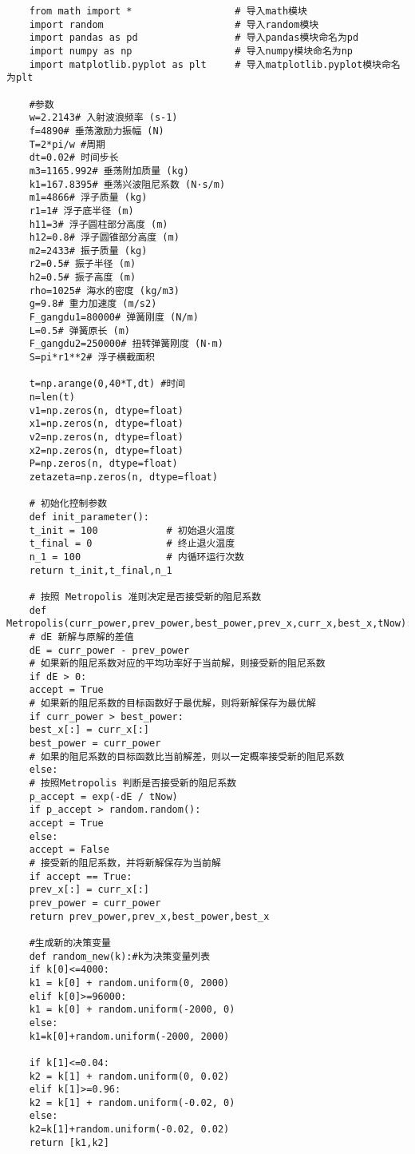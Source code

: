 \documentclass[a4paper,12pt]{article}
\begin{document}
	\begin{lstlisting}
	from math import *                  # 导入math模块
	import random                       # 导入random模块
	import pandas as pd                 # 导入pandas模块命名为pd
	import numpy as np                  # 导入numpy模块命名为np
	import matplotlib.pyplot as plt     # 导入matplotlib.pyplot模块命名为plt
	
	#参数
	w=2.2143# 入射波浪频率 (s-1)
	f=4890# 垂荡激励力振幅 (N)
	T=2*pi/w #周期
	dt=0.02# 时间步长
	m3=1165.992# 垂荡附加质量 (kg)
	k1=167.8395# 垂荡兴波阻尼系数 (N·s/m)
	m1=4866# 浮子质量 (kg)
	r1=1# 浮子底半径 (m)
	h11=3# 浮子圆柱部分高度 (m)
	h12=0.8# 浮子圆锥部分高度 (m)
	m2=2433# 振子质量 (kg)
	r2=0.5# 振子半径 (m)
	h2=0.5# 振子高度 (m)
	rho=1025# 海水的密度 (kg/m3)
	g=9.8# 重力加速度 (m/s2)
	F_gangdu1=80000# 弹簧刚度 (N/m)
	L=0.5# 弹簧原长 (m)
	F_gangdu2=250000# 扭转弹簧刚度 (N·m)
	S=pi*r1**2# 浮子横截面积
	
	t=np.arange(0,40*T,dt) #时间
	n=len(t)
	v1=np.zeros(n, dtype=float)
	x1=np.zeros(n, dtype=float)
	v2=np.zeros(n, dtype=float)
	x2=np.zeros(n, dtype=float)
	P=np.zeros(n, dtype=float)
	zetazeta=np.zeros(n, dtype=float)
	
	# 初始化控制参数
	def init_parameter():
	t_init = 100            # 初始退火温度
	t_final = 0             # 终止退火温度
	n_1 = 100               # 内循环运行次数
	return t_init,t_final,n_1
	
	# 按照 Metropolis 准则决定是否接受新的阻尼系数
	def Metropolis(curr_power,prev_power,best_power,prev_x,curr_x,best_x,tNow):
	# dE 新解与原解的差值
	dE = curr_power - prev_power
	# 如果新的阻尼系数对应的平均功率好于当前解，则接受新的阻尼系数
	if dE > 0:
	accept = True
	# 如果新的阻尼系数的目标函数好于最优解，则将新解保存为最优解
	if curr_power > best_power:
	best_x[:] = curr_x[:]
	best_power = curr_power
	# 如果的阻尼系数的目标函数比当前解差，则以一定概率接受新的阻尼系数
	else:
	# 按照Metropolis 判断是否接受新的阻尼系数
	p_accept = exp(-dE / tNow)
	if p_accept > random.random():
	accept = True
	else:
	accept = False
	# 接受新的阻尼系数，并将新解保存为当前解
	if accept == True:
	prev_x[:] = curr_x[:]
	prev_power = curr_power
	return prev_power,prev_x,best_power,best_x
	
	#生成新的决策变量
	def random_new(k):#k为决策变量列表
	if k[0]<=4000:
	k1 = k[0] + random.uniform(0, 2000)
	elif k[0]>=96000:
	k1 = k[0] + random.uniform(-2000, 0)
	else:
	k1=k[0]+random.uniform(-2000, 2000)
	
	if k[1]<=0.04:
	k2 = k[1] + random.uniform(0, 0.02)
	elif k[1]>=0.96:
	k2 = k[1] + random.uniform(-0.02, 0)
	else:
	k2=k[1]+random.uniform(-0.02, 0.02)
	return [k1,k2]
	

\end{lstlisting}
\end{document}
